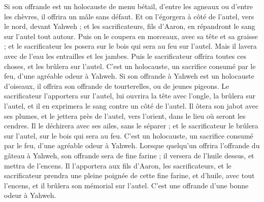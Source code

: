 \begin{multicols}{2}
Si son offrande est un holocauste de menu bétail, d'entre les agneaux ou d'entre les chèvres, il offrira un mâle sans défaut.
Et on l'égorgera à côté de l'autel, vers le nord, devant Yahweh ; et les sacrificateurs, fils d'Aaron, en répandront le sang sur l'autel tout autour.
Puis on le coupera en morceaux, avec sa tête et sa graisse ; et le sacrificateur les posera sur le bois qui sera au feu sur l'autel.
Mais il lavera avec de l'eau les entrailles et les jambes. Puis le sacrificateur offrira toutes ces choses, et les brûlera sur l'autel. C'est un holocauste, un sacrifice consumé par le feu, d'une agréable odeur à Yahweh.
Si son offrande à Yahweh est un holocauste d'oiseaux, il offrira son offrande de tourterelles, ou de jeunes pigeons.
Le sacrificateur l'apportera sur l'autel, lui ouvrira la tête avec l'ongle, la brûlera sur l'autel, et il en exprimera le sang contre un côté de l'autel.
Il ôtera son jabot avec ses plumes, et le jettera près de l'autel, vers l'orient, dans le lieu où seront les cendres.
Il le déchirera avec ses ailes, sans le séparer ; et le sacrificateur le brûlera sur l'autel, sur le bois qui sera au feu. C'est un holocauste, un sacrifice consumé par le feu, d'une agréable odeur à Yahweh.
\VerseOne{}Lorsque quelqu'un offrira l'offrande du gâteau à Yahweh, son offrande sera de fine farine ; il versera de l'huile dessus, et mettra de l'encens.
Il l'apportera aux fils d'Aaron, les sacrificateurs, et le sacrificateur prendra une pleine poignée de cette fine farine, et d'huile, avec tout l'encens, et il brûlera son mémorial sur l'autel. C'est une offrande d'une bonne odeur à Yahweh.

\end{multicols}
